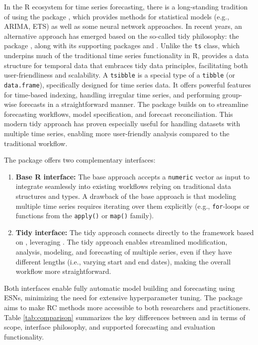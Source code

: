 In the R ecosystem for time series forecasting, there is a long-standing tradition of using the  package \citep{forecast}, which provides methods for statistical models (e.g., ARIMA, ETS) as well as some neural network approaches. In recent years, an alternative approach has emerged based on the so-called tidy philosophy: the  package \citep{fable}, along with its supporting packages  \citep{tsibble} and  \citep{fabletools}. Unlike the \texttt{ts} class, which underpins much of the traditional time series functionality in R,  provides a data structure for temporal data that embraces tidy data principles, facilitating both user-friendliness and scalability. A \texttt{tsibble} is a special type of a \texttt{tibble} (or \texttt{data.frame}), specifically designed for time series data. It offers powerful features for time-based indexing, handling irregular time series, and performing group-wise forecasts in a straightforward manner. The  package builds on  to streamline forecasting workflows, model specification, and forecast reconciliation. This modern tidy approach has proven especially useful for handling datasets with multiple time series, enabling more user-friendly analysis compared to the traditional workflow.

The package  offers two complementary interfaces:

\begin{enumerate}
\def\labelenumi{\arabic{enumi}.}
\tightlist
\item
  \textbf{Base R interface:} The base approach accepts a \texttt{numeric} vector as input to integrate seamlessly into existing workflows relying on traditional data structures and types. A drawback of the base approach is that modeling multiple time series requires iterating over them explicitly (e.g., \texttt{for}-loops or functions from the \texttt{apply()} or \texttt{map()} family).
\item
  \textbf{Tidy interface:} The tidy approach connects directly to the  framework based on , leveraging . The tidy approach enables streamlined modification, analysis, modeling, and forecasting of multiple series, even if they have different lengths (i.e., varying start and end dates), making the overall workflow more straightforward.
\end{enumerate}

Both interfaces enable fully automatic model building and forecasting using ESNs, minimizing the need for extensive hyperparameter tuning. The  package aims to make RC methods more accessible to both researchers and practitioners. Table \ref{tab:comparison} summarizes the key differences between  and  in terms of scope, interface philosophy, and supported forecasting and evaluation functionality.

